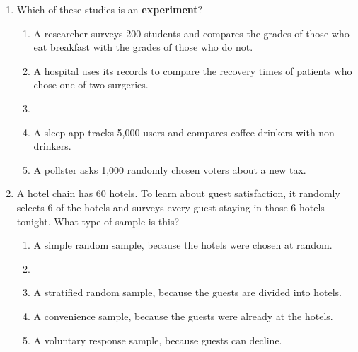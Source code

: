 \documentclass[12pt]{article}
\begin{document}
\begin{enumerate}[leftmargin=1.9em, itemsep=0.13in]
  \boxguard[14]
  \item Which of these studies is an \textbf{experiment}?
        \begin{enumerate}[label=\textbf{(\Alph*)}, leftmargin=2.2em, itemsep=2pt]
          \item A researcher surveys 200 students and compares the grades of those who eat
                breakfast with the grades of those who do not.
          \item A hospital uses its records to compare the recovery times of patients who chose
                one of two surgeries.
          \item {}
          \item A sleep app tracks 5{,}000 users and compares coffee drinkers with non-drinkers.
          \item A pollster asks 1{,}000 randomly chosen voters about a new tax.\hfill{}\rule[-0.2in]{0pt}{0.48in}
        \end{enumerate}

  \boxguard[13]
  \item A hotel chain has 60 hotels. To learn about guest satisfaction, it randomly selects 6
        of the hotels and surveys every guest staying in those 6 hotels tonight. What type of
        sample is this?
        \begin{enumerate}[label=\textbf{(\Alph*)}, leftmargin=2.2em, itemsep=2pt]
          \item A simple random sample, because the hotels were chosen at random.
          \item {}
          \item A stratified random sample, because the guests are divided into hotels.
          \item A convenience sample, because the guests were already at the hotels.
          \item A voluntary response sample, because guests can decline.\hfill{}\rule[-0.2in]{0pt}{0.48in}
        \end{enumerate}


\end{enumerate}
\end{document}
